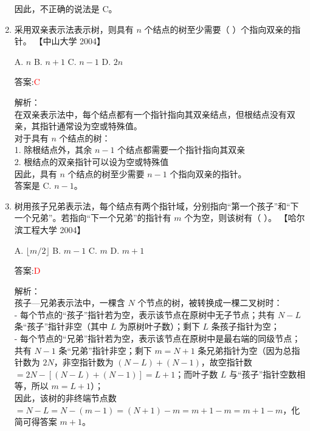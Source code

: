 \documentclass[lang=cn,newtx,10pt,scheme=chinese]{../../../elegantbook}
\begin{document}
\begin{enumerate}
    因此，不正确的说法是 C。\\  

    \item 采用双亲表示法表示树，则具有 $n$ 个结点的树至少需要（ ）个指向双亲的指针。  
    【中山大学 2004】  

    A. $n$ \quad B. $n + 1$ \quad C. $n - 1$ \quad D. $2n$  

    答案:\textcolor{red}{C}
    
    解析：\\
    在双亲表示法中，每个结点都有一个指针指向其双亲结点，但根结点没有双亲，其指针通常设为空或特殊值。\\
    
    对于具有 $n$ 个结点的树：\\
    1. 除根结点外，其余 $n-1$ 个结点都需要一个指针指向其双亲\\
    2. 根结点的双亲指针可以设为空或特殊值\\
    
    因此，具有 $n$ 个结点的树至少需要 $n-1$ 个指向双亲的指针。\\
    
    答案是 C. $n - 1$。\\  

    \item 树用孩子兄弟表示法，每个结点有两个指针域，分别指向“第一个孩子”和“下一个兄弟”。若指向“下一个兄弟”的指针有 $m$ 个为空，则该树有（ ）。  
    【哈尔滨工程大学 2004】

    A. $\lfloor m / 2 \rfloor$  
    B. $m - 1$  
    C. $m$  
    D. $m + 1$

    答案:\textcolor{red}{D}

    解析：\\
    孩子—兄弟表示法中，一棵含 $N$ 个节点的树，被转换成一棵二叉树时：\\
    - 每个节点的“孩子”指针若为空，表示该节点在原树中无子节点；共有 $N - L$ 条“孩子”指针非空（其中 $L$ 为原树叶子数）；剩下 $L$ 条孩子指针为空；\\
    - 每个节点的“兄弟”指针若为空，表示该节点在原树中是最右端的同级节点；共有 $N - 1$ 条“兄弟”指针非空；剩下 $m = N + 1$ 条兄弟指针为空（因为总指针数为 $2N$，非空指针数为 $(N - L) + (N - 1)$，故空指针数 $= 2N - [(N - L)+(N - 1)] = L + 1$；而叶子数 $L$ 与“孩子”指针空数相等，所以 $m = L + 1$）；\\
    因此，该树的非终端节点数 $= N - L = N - (m - 1) = (N + 1) - m = m + 1 - m = m + 1 - m$，化简可得答案 $m + 1$。\\


\end{enumerate}
\end{document}
